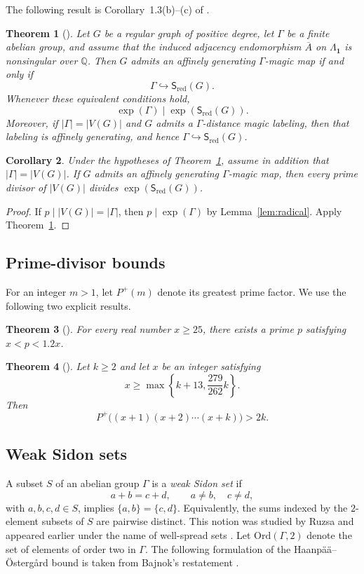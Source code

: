 \documentclass[11pt,reqno]{amsart}
\theoremstyle{plain}
\newtheorem{theorem}{Theorem}[section]
\newtheorem{corollary}[theorem]{Corollary}
\theoremstyle{definition}
\theoremstyle{remark}
\DeclareMathOperator{\ex}{exp}
\newcommand{\Sred}{\mathsf S_{\mathrm{red}}}
\newcommand{\Lamone}{\Lambda_{\mathbf1}}
\begin{document}
The following result is Corollary~1.3(b)--(c) of \cite{Bat26}.

\begin{theorem}[\cite{Bat26}]
\label{thm:reduced-criterion}
Let $G$ be a regular graph of positive degree, let $\Gamma$ be a finite abelian
group, and assume that the induced adjacency endomorphism $\overline A$ on
$\Lamone$ is nonsingular over $\mathbb Q$. Then $G$ admits an affinely
generating $\Gamma$-magic map if and only if
\[
  \Gamma\hookrightarrow\Sred(G).
\]
Whenever these equivalent conditions hold,
\[
  \ex(\Gamma)\mid\ex(\Sred(G)).
\]
Moreover, if $|\Gamma|=|V(G)|$ and $G$ admits a
$\Gamma$-distance magic labeling, then that labeling is affinely generating,
and hence $\Gamma\hookrightarrow\Sred(G)$.
\end{theorem}

\begin{corollary}\label{cor:prime-obstruction}
Under the hypotheses of Theorem~\ref{thm:reduced-criterion}, assume in addition
that $|\Gamma|=|V(G)|$. If $G$ admits an affinely generating $\Gamma$-magic
map, then every prime divisor of $|V(G)|$ divides $\ex(\Sred(G))$.
\end{corollary}

\begin{proof}
If $p\mid|V(G)|=|\Gamma|$, then $p\mid\ex(\Gamma)$ by
Lemma~\ref{lem:radical}. Apply Theorem~\ref{thm:reduced-criterion}.
\end{proof}

\subsection{Prime-divisor bounds}
For an integer $m>1$, let $P^{+}(m)$ denote its greatest prime factor. We use
the following two explicit results.

\begin{theorem}[\cite{Nag52}]\label{thm:nagura}
For every real number $x\ge25$, there exists a prime $p$ satisfying
$x<p<1.2x$.
\end{theorem}

\begin{theorem}[\cite{LS05}]\label{thm:LS}
Let $k\ge2$ and let $x$ be an integer satisfying
\[
 x\ge\max\left\{k+13,\frac{279}{262}k\right\}.
\]
Then
\[
  P^{+}\bigl((x+1)(x+2)\cdots(x+k)\bigr)>2k.
\]
\end{theorem}

\subsection{Weak Sidon sets}
A subset $S$ of an abelian group $\Gamma$ is a \emph{weak Sidon set} if
\[
  a+b=c+d,\qquad a\ne b,\quad c\ne d,
\]
with $a,b,c,d\in S$, implies $\{a,b\}=\{c,d\}$. Equivalently, the sums indexed
by the $2$-element subsets of $S$ are pairwise distinct. This notion was
studied by Ruzsa \cite{Ruz93} and appeared earlier under the name of well-spread
sets \cite{Kot72}. Let
$\mathrm{Ord}(\Gamma,2)$ denote the set of elements of order two in $\Gamma$.
The following formulation of the Haanp\"a\"a--\"Osterg\r{a}rd bound is taken
from Bajnok's restatement \cite{Baj18}.
\end{document}
